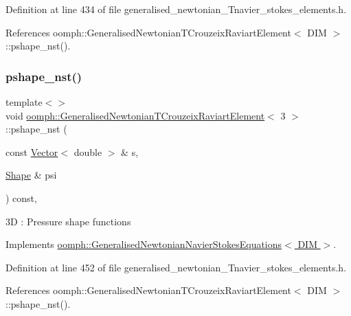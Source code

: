 Definition at line 434 of file generalised\+\_\+newtonian\+\_\+\+Tnavier\+\_\+stokes\+\_\+elements.\+h.



References oomph\+::\+Generalised\+Newtonian\+T\+Crouzeix\+Raviart\+Element$<$ D\+I\+M $>$\+::pshape\+\_\+nst().

\mbox{\label{classoomph_1_1GeneralisedNewtonianTCrouzeixRaviartElement_a877ec432e5495538da93971282762e2f}} 
\subsubsection{\texorpdfstring{pshape\+\_\+nst()}{pshape\_nst()}\hspace{0.1cm}{\footnotesize\ttfamily [5/6]}}
{\footnotesize\ttfamily template$<$$>$ \\
void \hyperlink{classoomph_1_1GeneralisedNewtonianTCrouzeixRaviartElement}{oomph\+::\+Generalised\+Newtonian\+T\+Crouzeix\+Raviart\+Element}$<$ 3 $>$\+::pshape\+\_\+nst (\begin{DoxyParamCaption}\item[{const \hyperlink{classoomph_1_1Vector}{Vector}$<$ double $>$ \&}]{s,  }\item[{\hyperlink{classoomph_1_1Shape}{Shape} \&}]{psi }\end{DoxyParamCaption}) const\hspace{0.3cm}{\ttfamily [inline]}, {\ttfamily [virtual]}}

3D \+: Pressure shape functions 

Implements \hyperlink{classoomph_1_1GeneralisedNewtonianNavierStokesEquations_a84735d21f3d1ade819726a71a7b462e1}{oomph\+::\+Generalised\+Newtonian\+Navier\+Stokes\+Equations$<$ D\+I\+M $>$}.



Definition at line 452 of file generalised\+\_\+newtonian\+\_\+\+Tnavier\+\_\+stokes\+\_\+elements.\+h.



References oomph\+::\+Generalised\+Newtonian\+T\+Crouzeix\+Raviart\+Element$<$ D\+I\+M $>$\+::pshape\+\_\+nst().

